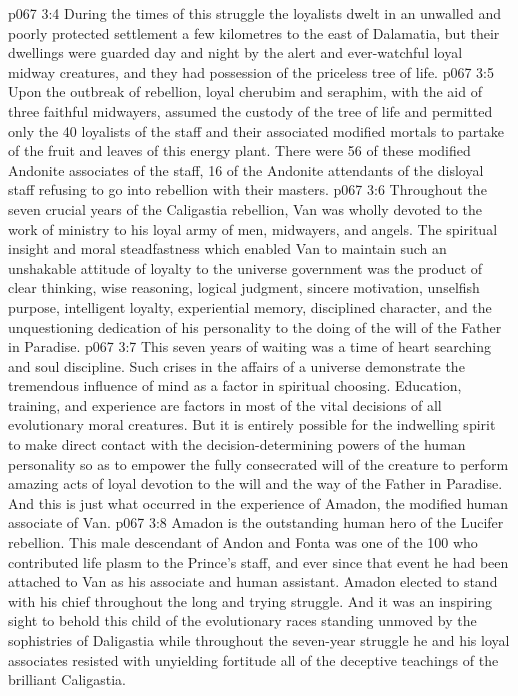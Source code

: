 \vs p067 3:4 During the times of this struggle the loyalists dwelt in an unwalled and poorly protected settlement a few kilometres to the east of Dalamatia, but their dwellings were guarded day and night by the alert and ever\hyp{}watchful loyal midway creatures, and they had possession of the priceless tree of life.
\vs p067 3:5 Upon the outbreak of rebellion, loyal cherubim and seraphim, with the aid of three faithful midwayers, assumed the custody of the tree of life and permitted only the 40 loyalists of the staff and their associated modified mortals to partake of the fruit and leaves of this energy plant. There were 56 of these modified Andonite associates of the staff, 16 of the Andonite attendants of the disloyal staff refusing to go into rebellion with their masters.
\vs p067 3:6 \pc Throughout the seven crucial years of the Caligastia rebellion, Van was wholly devoted to the work of ministry to his loyal army of men, midwayers, and angels. The spiritual insight and moral steadfastness which enabled Van to maintain such an unshakable attitude of loyalty to the universe government was the product of clear thinking, wise reasoning, logical judgment, sincere motivation, unselfish purpose, intelligent loyalty, experiential memory, disciplined character, and the unquestioning dedication of his personality to the doing of the will of the Father in Paradise.
\vs p067 3:7 This seven years of waiting was a time of heart searching and soul discipline. Such crises in the affairs of a universe demonstrate the tremendous influence of mind as a factor in spiritual choosing. Education, training, and experience are factors in most of the vital decisions of all evolutionary moral creatures. But it is entirely possible for the indwelling spirit to make direct contact with the decision\hyp{}determining powers of the human personality so as to empower the fully consecrated will of the creature to perform amazing acts of loyal devotion to the will and the way of the Father in Paradise. And this is just what occurred in the experience of Amadon, the modified human associate of Van.
\vs p067 3:8 Amadon is the outstanding human hero of the Lucifer rebellion. This male descendant of Andon and Fonta was one of the 100 who contributed life plasm to the Prince’s staff, and ever since that event he had been attached to Van as his associate and human assistant. Amadon elected to stand with his chief throughout the long and trying struggle. And it was an inspiring sight to behold this child of the evolutionary races standing unmoved by the sophistries of Daligastia while throughout the seven\hyp{}year struggle he and his loyal associates resisted with unyielding fortitude all of the deceptive teachings of the brilliant Caligastia.

